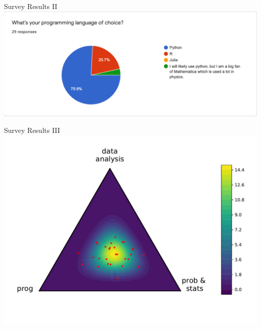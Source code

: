 \documentclass[aspectratio=169]{beamer}
\begin{document}
\begin{frame}{Survey Results II}
\centering
\includegraphics[width=.9\textwidth]{figures/lap2/survey-pl.pdf}
\end{frame}

\begin{frame}{Survey Results III}
\centering
\includegraphics[width=.75\textwidth]{figures/lap2/survey.pdf}
\end{frame}
\end{document}
